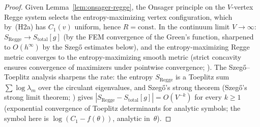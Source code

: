 \begin{proof}
Given Lemma~\ref{lem:onsager-regge}, the Onsager
principle on the $V$-vertex Regge system selects the
entropy-maximizing vertex configuration, which by~(H2a)
has $C_1(v)$ uniform, hence $R = \mathrm{const}$.
In the continuum limit $V \to \infty$:
$S_{\mathrm{Regge}} \to S_{\mathrm{total}}[g]$
(by the FEM convergence of the Green's function,
sharpened to $O(h^\infty)$ by the Szeg\H{o}
estimates below),
and the entropy-maximizing Regge metric converges to
the entropy-maximizing smooth metric
(strict concavity ensures convergence of maximizers
under pointwise convergence; \citealt{DalMaso1993}).
The Szeg\H{o}--Toeplitz analysis sharpens the rate:
the entropy $S_{\mathrm{Regge}}$ is a Toeplitz sum
$\sum \log\lambda_m$ over the circulant eigenvalues,
and Szeg\H{o}'s strong theorem
(Szeg\H{o}'s strong limit theorem;
\citealt{GrenanderSzego1958})
gives $|S_{\mathrm{Regge}} - S_{\mathrm{total}}[g]|
= O(V^{-k})$ for every $k \ge 1$
(exponential convergence of Toeplitz determinants
for analytic symbols; the symbol here is
$\log(C_1 - f(\theta))$, analytic in~$\theta$).
\end{proof}

